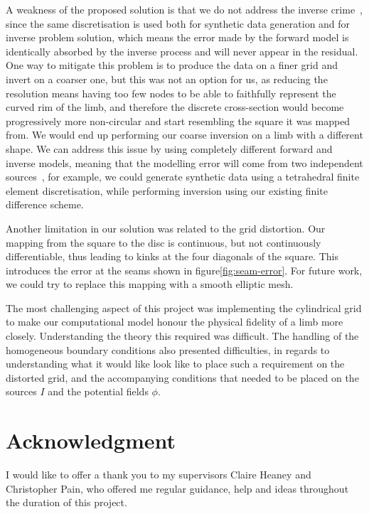 \documentclass[final-report]{report-template}
\begin{document}
A weakness of the proposed solution is that we do not address the inverse crime~\cite{wirgin2004}, since the same discretisation is used both for synthetic data generation and for inverse problem solution, which means the error made by the forward model is identically absorbed by the inverse process and will never appear in the residual. One way to mitigate this problem is to produce the data on a finer grid and invert on a coarser one, but this was not an option for us, as reducing the resolution means having too few nodes to be able to faithfully represent the curved rim of the limb, and therefore the discrete cross-section would become progressively more non-circular and start resembling the square it was mapped from. We would end up performing our coarse inversion on a limb with a different shape. We can address this issue by using completely different forward and inverse models, meaning that the modelling error will come from two independent sources~\cite{kaipio2007}, for example, we could generate synthetic data using a tetrahedral finite element discretisation, while performing inversion using our existing finite difference scheme.

Another limitation in our solution was related to the grid distortion. Our mapping from the square to the disc is continuous, but not continuously differentiable, thus leading to kinks at the four diagonals of the square. This introduces the error at the seams shown in figure\ref{fig:seam-error}. For future work, we could try to replace this mapping with a smooth elliptic mesh.

The most challenging aspect of this project was implementing the cylindrical grid to make our computational model honour the physical fidelity of a limb more closely. Understanding the theory this required was difficult. The handling of the homogeneous boundary conditions also presented difficulties, in regards to understanding what it would like look like to place such a requirement on the distorted grid, and the accompanying conditions that needed to be placed on the sources $I$ and the potential fields $\phi$.

\section{Acknowledgment}
I would like to offer a thank you to my supervisors Claire Heaney and Christopher Pain, who offered me regular guidance, help and ideas throughout the duration of this project.


 
\end{document}
